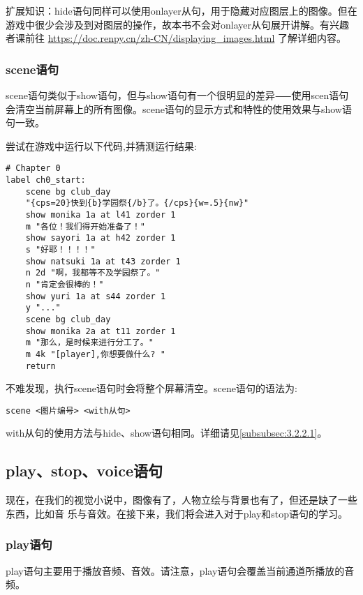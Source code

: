\begin{ExtraKnowledge}
    扩展知识：hide语句同样可以使用onlayer从句，用于隐藏对应图层上的图像。但在游戏中很少会涉及到对图层的操作，故本书不会对onlayer从句展开讲解。有兴趣者课前往 \url{https://doc.renpy.cn/zh-CN/displaying_images.html} 了解详细内容。
\end{ExtraKnowledge}

\subsubsection{scene语句}
\label{subsubsec:3.2.2.3}

scene语句类似于show语句，但与show语句有一个很明显的差异⸺使用scen语句会清空当前屏幕上的所有图像。scene语句的显示方式和特性的使用效果与show语句一致。

尝试在游戏中运行以下代码,并猜测运行结果:
\begin{lstlisting}[caption=script-ch1.rpy]
# Chapter 0
label ch0_start:
    scene bg club_day
    "{cps=20}快到{b}学园祭{/b}了。{/cps}{w=.5}{nw}"
    show monika 1a at l41 zorder 1
    m "各位！我们得开始准备了！"
    show sayori 1a at h42 zorder 1
    s "好耶！！！！"
    show natsuki 1a at t43 zorder 1
    n 2d "啊，我都等不及学园祭了。"
    n "肯定会很棒的！"
    show yuri 1a at s44 zorder 1
    y "..."
    scene bg club_day
    show monika 2a at t11 zorder 1
    m "那么，是时候来进行分工了。"
    m 4k "[player],你想要做什么? "
    return
\end{lstlisting}

不难发现，执行scene语句时会将整个屏幕清空。scene语句的语法为:

\begin{lstlisting}[numbers=none]
scene <图片编号> <with从句>
\end{lstlisting}

with从句的使用方法与hide、show语句相同。详细请见\ref{subsubsec:3.2.2.1}。

\subsection{play、stop、voice语句}
现在，在我们的视觉小说中，图像有了，人物立绘与背景也有了，但还是缺了一些东西，比如音
乐与音效。在接下来，我们将会进入对于play和stop语句的学习。

\subsubsection{play语句}

play语句主要用于播放音频、音效。请注意，play语句会覆盖当前通道所播放的音频。

